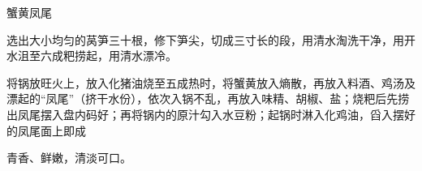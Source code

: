 \begin{recipe}{蟹黄凤尾}

\ingredients


\cooking

\step 选出大小均匀的莴笋三十根，修下笋尖，切成三寸长的段，用清水淘洗干净，用开水沮至六成粑捞起，用清水漂冷。

\step 将锅放旺火上，放入化猪油烧至五成热时，将蟹黄放入熵散，再放入料酒、鸡汤及漂起的“凤尾”（挤干水份），依次入锅不乱，再放入味精、胡椒、盐；烧粑后先捞出凤尾摆入盘内码好；再将锅内的原汁勾入水豆粉；起锅时淋入化鸡油，舀入摆好的凤尾面上即成

\notes

青香、鲜嫩，清淡可口。

\end{recipe}


